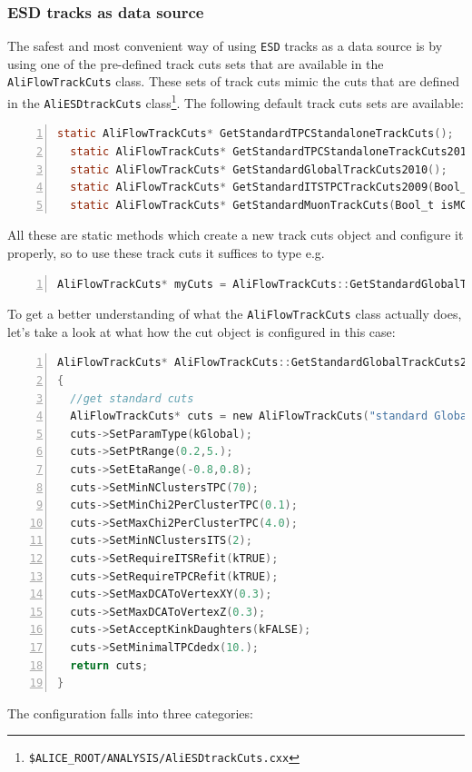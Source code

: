 \documentclass[a4paper]{book}
\numberwithin{equation}{subsection}
\begin{document}
\subsubsection{ESD tracks as data source}
The safest and most convenient way of using \texttt{ESD} tracks as a data source is by using one of the pre-defined track cuts sets that are available in the \texttt{AliFlowTrackCuts} class. These sets of track cuts mimic the cuts that are defined in the \texttt{AliESDtrackCuts} class\footnote{\texttt{\$ALICE\_ROOT/ANALYSIS/AliESDtrackCuts.cxx}}. The following default track cuts sets are available:
\begin{lstlisting}[language=C, numbers=left]
  static AliFlowTrackCuts* GetStandardTPCStandaloneTrackCuts();
  static AliFlowTrackCuts* GetStandardTPCStandaloneTrackCuts2010();
  static AliFlowTrackCuts* GetStandardGlobalTrackCuts2010();
  static AliFlowTrackCuts* GetStandardITSTPCTrackCuts2009(Bool_t selPrimaries=kTRUE);
  static AliFlowTrackCuts* GetStandardMuonTrackCuts(Bool_t isMC=kFALSE, Int_t passN=2);
  \end{lstlisting}
All these are static methods which create a new track cuts object and configure it properly, so to use these track cuts it suffices to type e.g.
\begin{lstlisting}[language=C, numbers=left]
AliFlowTrackCuts* myCuts = AliFlowTrackCuts::GetStandardGlobalTrackCuts2010();\end{lstlisting}
To get a better understanding of what the \texttt{AliFlowTrackCuts} class actually does, let's take a look at what how the cut object is configured in this case:
\begin{lstlisting}[language=C, numbers=left]
AliFlowTrackCuts* AliFlowTrackCuts::GetStandardGlobalTrackCuts2010()
{
  //get standard cuts
  AliFlowTrackCuts* cuts = new AliFlowTrackCuts("standard Global tracks");
  cuts->SetParamType(kGlobal);
  cuts->SetPtRange(0.2,5.);
  cuts->SetEtaRange(-0.8,0.8);
  cuts->SetMinNClustersTPC(70);
  cuts->SetMinChi2PerClusterTPC(0.1);
  cuts->SetMaxChi2PerClusterTPC(4.0);
  cuts->SetMinNClustersITS(2);
  cuts->SetRequireITSRefit(kTRUE);
  cuts->SetRequireTPCRefit(kTRUE);
  cuts->SetMaxDCAToVertexXY(0.3);
  cuts->SetMaxDCAToVertexZ(0.3);
  cuts->SetAcceptKinkDaughters(kFALSE);
  cuts->SetMinimalTPCdedx(10.);
  return cuts;
}\end{lstlisting}
The configuration falls into three categories:
\end{document}
